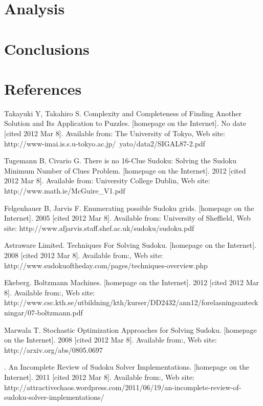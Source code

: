 \documentclass[a4paper,11pt]{kth-mag}
\begin{document}
\chapter{Analysis}

\chapter{Conclusions}


\chapter{References}

\begin{thebibliography}{99}

Takayuki Y, Takahiro S. Complexity and Completeness of Finding Another Solution and Its Application to Puzzles. [homepage on the Internet]. No date [cited 2012 Mar 8]. Available from: The University of Tokyo, Web site: http://www-imai.is.s.u-tokyo.ac.jp/~yato/data2/SIGAL87-2.pdf

Tugemann B, Civario G. There is no 16-Clue Sudoku: Solving the Sudoku Minimum Number of Clues Problem. [homepage on the Internet]. 2012 [cited 2012 Mar 8]. Available from: University College Dublin, Web site: http://www.math.ie/McGuire\_V1.pdf

Felgenhauer B, Jarvis F. Enumerating possible Sudoku grids. [homepage on the Internet]. 2005 [cited 2012 Mar 8]. Available from: University of Sheffield, Web site: http://www.afjarvis.staff.shef.ac.uk/sudoku/sudoku.pdf

Astraware Limited. Techniques For Solving Sudoku. [homepage on the Internet]. 2008 [cited 2012 Mar 8]. Available from:, Web site: http://www.sudokuoftheday.com/pages/techniques-overview.php

Ekeberg. Boltzmann Machines. [homepage on the Internet]. 2012 [cited 2012 Mar 8]. Available from:, Web site: http://www.csc.kth.se/utbildning/kth/kurser/DD2432/ann12/forelasningsanteckningar/07-boltzmann.pdf

Marwala T. Stochastic Optimization Approaches for Solving Sudoku. [homepage on the Internet]. 2008 [cited 2012 Mar 8]. Available from:, Web site: http://arxiv.org/abs/0805.0697

. An Incomplete Review of Sudoku Solver Implementations. [homepage on the Internet]. 2011 [cited 2012 Mar 8]. Available from:, Web site: http://attractivechaos.wordpress.com/2011/06/19/an-incomplete-review-of-sudoku-solver-implementations/


\end{thebibliography}
\end{document}
